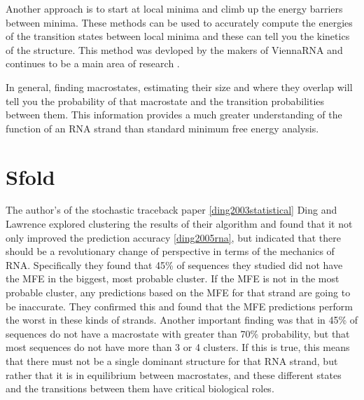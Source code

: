 Another approach is to start at local minima and climb up the energy
barriers between minima. These methods can be used to accurately
compute the energies of the transition states between local minima and
these can tell you the kinetics of the structure. This method was
devloped by the makers of ViennaRNA and continues to be a main area of
research \cite{PhysRevE.83.011113} \cite{wolfinger2004efficient} .

In general, finding macrostates, estimating their size and where they
overlap will tell you the probability of that macrostate and the
transition probabilities between them. This information provides a
much greater understanding of the function of an RNA strand than
standard minimum free energy analysis. 

\section{Sfold}

The author's of the stochastic traceback paper
\ref{ding2003statistical} Ding and Lawrence explored clustering the
results of their algorithm and found that it not only improved the
prediction accuracy \ref{ding2005rna}, but indicated that there should
be a revolutionary change of perspective in terms of the mechanics of
RNA. Specifically they found that 45\% of sequences they studied did
not have the MFE in the biggest, most probable cluster. If the MFE is
not in the most probable cluster, any predictions based on the MFE for
that strand are going to be inaccurate. They confirmed this and found
that the MFE predictions perform the worst in these kinds of
strands. Another important finding was that in 45\% of sequences do
not have a macrostate with greater than 70\% probability, but that
most sequences do not have more than 3 or 4 clusters. If this is true,
this means that there must not be a single dominant structure for that
RNA strand, but rather that it is in equilibrium between macrostates,
and these different states and the transitions between them have
critical biological roles. 

